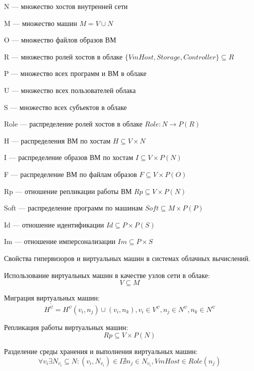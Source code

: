N --- множество хостов внутренней сети

M --- множество машин $M = V \cup N$

O --- множество файлов образов ВМ

R --- множество ролей хостов в облаке $\{VmHost, Storage, Controller\} \subseteq R$

P --- множество всех программ и ВМ в облаке

U --- множество всех пользователей облака

S --- множество всех субъектов в облаке

Role --- распределение ролей хостов в облаке $Role:N \rightarrow P(R)$

H --- распределения ВМ по хостам $H \subseteq V \times N$

I --- распределение образов ВМ по хостам $I \subseteq V \times P(N)$

F --- распределение ВМ по файлам образов $F \subseteq V \times P(O)$

Rp --- отношение репликации работы ВМ $Rp \subseteq V \times P(N)$

Soft --- распределение программ по машинам $Soft \subseteq M \times P(P)$

Id --- отношение идентификации $Id \subseteq P \times P(S)$

Im --- отношение имперсонализации $Im \subseteq P \times S$


Свойства гипервизоров и виртуальных машин в системах облачных вычислений.

Использование виртуальных машин в качестве узлов сети в облаке:
\begin{equation}
V \subseteq M
\end{equation}

Миграция виртуальных машин:
\begin{equation}
H^{\tilde{\psi}} = H^{\psi} (v_i, n_j) \cup (v_i, n_k), v_i \in V^{\psi}, n_j \in N^{\psi}, n_k \in N^{\psi}
\end{equation}

Репликация работы виртуальных машин:
\begin{equation}
Rp \subseteq V \times P(N)
\end{equation}

Разделение среды хранения и выполнения виртуальных машин:
\begin{equation}
\forall v_i \exists N_{v_i} \subseteq N :
(v_i, N_{v_i}) \in I \nexists n_j \in N_{v_i}, VmHost \in Role(n_j)
\end{equation}

